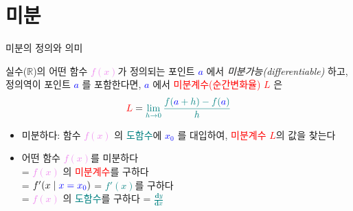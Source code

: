 \documentclass[aspectratio=169]{beamer}
\begin{document}
\section{미분}
\begin{frame}{미분의 정의와 의미}
  \begin{definition}[도함수]
    실수($\mathbb{R}$)의 어떤 함수 \textcolor{violet}{$f(x)$}가 정의되는 포인트 \textcolor{blue}{\emph{$a$}} 에서 \emph{미분가능(differentiable)} 하고, 정의역이 포인트 \textcolor{blue}{\emph{$a$}} 를 포함한다면, \textcolor{blue}{\emph{$a$}} 에서 \textcolor{red}{미분계수(순간변화율)} \textcolor{red}{\emph{$L$}} 은 \\
    \begin{equation}
      \textcolor{red}{L} = \textcolor{teal}{\lim_{h \to 0} \frac{f(\textcolor{blue}{a}+h)-f(\textcolor{blue}{a})}{h}}
    \end{equation}
  \end{definition}
  \begin{itemize}
    \item 미분하다: 함수 \textcolor{violet}{$f(x)$} 의 \textcolor{teal}{도함수}에 \textcolor{blue}{\emph{$x_0$}} 를 대입하여, \textcolor{red}{미분계수 $L$}의 값을 찾는다
    \item 어떤 함수 \textcolor{violet}{$f(x)$}를 미분하다 \\
    = \textcolor{violet}{$f(x)$} 의 \textcolor{red}{미분계수}를 구하다 \\
    = \textcolor{teal}{$f'(x \mid \textcolor{blue}{x = x_0})$}
    = \textcolor{teal}{$f'(x)$}를 구하다 \\
    = \textcolor{violet}{$f(x)$} 의 \textcolor{teal}{도함수}를 구하다 
    = \textcolor{teal}{$\frac{\mathbf{d}y}{\mathbf{d}x}$}
  \end{itemize}
\end{frame}
\end{document}
